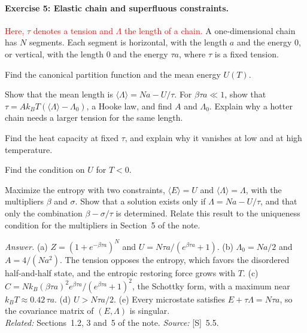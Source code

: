 \documentclass[11pt]{article}      %
\numberwithin{equation}{section}   %
\begin{document}
\paragraph{Exercise 5: Elastic chain and superfluous constraints.}
\textcolor{red}{Here, $\tau$ denotes a tension and $\Lambda$ the length of a chain.}
A one-dimensional chain has $N$ segments. Each segment is horizontal, with the length $a$ and the energy $0$, or vertical, with the length $0$ and the energy $\tau a$, where $\tau$ is a fixed tension.
\begin{parts}
    \item Find the canonical partition function and the mean energy $U(T)$.
    \item Show that the mean length is $\langle\Lambda\rangle = Na - U/\tau$. For $\beta\tau a \ll 1$, show that $\tau = A k_BT(\langle\Lambda\rangle - \Lambda_0)$, a Hooke law, and find $A$ and $\Lambda_0$. Explain why a hotter chain needs a larger tension for the same length.
    \item Find the heat capacity at fixed $\tau$, and explain why it vanishes at low and at high temperature.
    \item Find the condition on $U$ for $T < 0$.
    \item Maximize the entropy with two constraints, $\langle E\rangle = U$ and $\langle\Lambda\rangle = \Lambda$, with the multipliers $\beta$ and $\sigma$. Show that a solution exists only if $\Lambda = Na - U/\tau$, and that only the combination $\beta - \sigma/\tau$ is determined. Relate this result to the uniqueness condition for the multipliers in Section~5 of the note.
\end{parts}
\textit{Answer.} (a) $Z = (1 + e^{-\beta\tau a})^N$ and $U = N\tau a/(e^{\beta\tau a} + 1)$. (b) $\Lambda_0 = Na/2$ and $A = 4/(Na^2)$. The tension opposes the entropy, which favors the disordered half-and-half state, and the entropic restoring force grows with $T$. (c) $C = Nk_B(\beta\tau a)^2 e^{\beta\tau a}/(e^{\beta\tau a} + 1)^2$, the Schottky form, with a maximum near $k_BT \approx 0.42\,\tau a$. (d) $U > N\tau a/2$. (e) Every microstate satisfies $E + \tau\Lambda = N\tau a$, so the covariance matrix of $(E, \Lambda)$ is singular.\\
\textit{Related:} Sections~1.2, 3 and~5 of the note. \textit{Source:} [S]~5.5.
\end{document}
